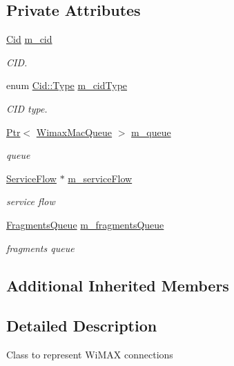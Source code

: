 \subsection*{Private Attributes}
\begin{DoxyCompactItemize}
\item 
\hyperlink{classns3_1_1Cid}{Cid} \hyperlink{classns3_1_1WimaxConnection_a89b058b93203233f3f9a8790c7ea7e89}{m\+\_\+cid}
\begin{DoxyCompactList}\small\item\em C\+ID. \end{DoxyCompactList}\item 
enum \hyperlink{classns3_1_1Cid_a10b8f92080ca5790e65a0bfa2f557e0a}{Cid\+::\+Type} \hyperlink{classns3_1_1WimaxConnection_a855c085f5f7431cdd6d750fe49239467}{m\+\_\+cid\+Type}
\begin{DoxyCompactList}\small\item\em C\+ID type. \end{DoxyCompactList}\item 
\hyperlink{classns3_1_1Ptr}{Ptr}$<$ \hyperlink{classns3_1_1WimaxMacQueue}{Wimax\+Mac\+Queue} $>$ \hyperlink{classns3_1_1WimaxConnection_a96fa093e7f190ca65d515206179c9faa}{m\+\_\+queue}
\begin{DoxyCompactList}\small\item\em queue \end{DoxyCompactList}\item 
\hyperlink{classns3_1_1ServiceFlow}{Service\+Flow} $\ast$ \hyperlink{classns3_1_1WimaxConnection_a1f584c9abac19d8efc5f9a34ac5306a8}{m\+\_\+service\+Flow}
\begin{DoxyCompactList}\small\item\em service flow \end{DoxyCompactList}\item 
\hyperlink{classns3_1_1WimaxConnection_acebd6aa95ab519f5e19bd1773f62e506}{Fragments\+Queue} \hyperlink{classns3_1_1WimaxConnection_ad3c9008071b97bc660d49c05d7279f95}{m\+\_\+fragments\+Queue}
\begin{DoxyCompactList}\small\item\em fragments queue \end{DoxyCompactList}\end{DoxyCompactItemize}
\subsection*{Additional Inherited Members}


\subsection{Detailed Description}
Class to represent Wi\+M\+AX connections 

